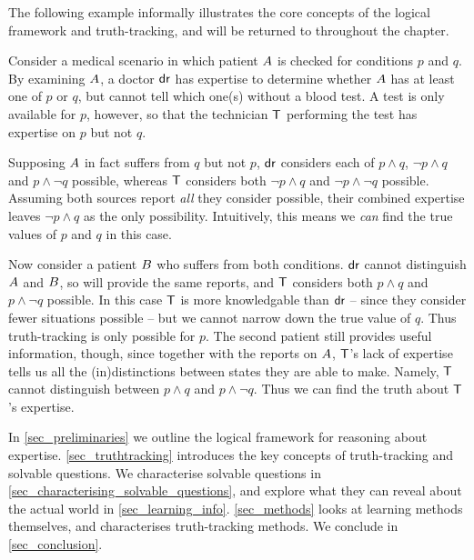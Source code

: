 
The following example informally illustrates the core concepts of the logical
framework and truth-tracking, and will be returned to throughout the chapter.

\begin{example}
    \label{ex_informal_example}

    Consider a medical scenario in which patient $A{}$ is checked for
    conditions $p$ and $q$. By examining $A{}$, a doctor
    $\mathsf{dr}{}$ has expertise to determine whether $A{}$ has at least one
    of $p$ or $q$, but cannot tell which one(s) without a blood test. A test is
    only available for $p$, however, so that the technician $\mathsf{T}{}$
    performing the test has expertise on $p$ but not $q$.

    Supposing $A{}$ in fact suffers from $q$ but not $p$, $\mathsf{dr}{}$
    considers each of $p \land q$, $\neg p \land q$ and $p \land \neg q$
    possible, whereas $\mathsf{T}{}$ considers both $\neg p \land q$ and $\neg p
    \land \neg q$ possible.
    Assuming both sources report \emph{all} they consider possible, their
    combined expertise leaves $\neg p \land q$ as the only
    possibility. Intuitively, this means we \emph{can} find the true values of
    $p$ and $q$ in this case.

    Now consider a patient $B{}$ who suffers from both conditions.
    $\mathsf{dr}{}$ cannot distinguish $A{}$ and $B{}$, so will provide
    the same reports, and $\mathsf{T}{}$ considers both $p \land q$ and $p \land
    \neg q$ possible. In this case $\mathsf{T}{}$ is more knowledgable than $\mathsf{dr}{}$
    -- since they consider fewer situations possible -- but we cannot narrow
    down the true value of $q$. Thus truth-tracking is only possible for $p$.
    The second patient still provides useful information, though, since
    together with the reports on $A{}$,
    $\mathsf{T}{}$'s lack of expertise tells us all the (in)distinctions between
    states they are able to make. Namely, $\mathsf{T}{}$ cannot distinguish between
    $p \land q$ and $p \land \neg q$. Thus we can find the truth about
    $\mathsf{T}{}$'s expertise.

\end{example}

\begin{chapteroutline}
    In \cref{sec_preliminaries} we outline the logical framework for reasoning
    about expertise. \cref{sec_truthtracking} introduces the key concepts of
    truth-tracking and solvable questions. We characterise solvable questions in
    \cref{sec_characterising_solvable_questions}, and explore what they can reveal
    about the actual world in \cref{sec_learning_info}. \cref{sec_methods} looks at
    learning methods themselves, and characterises truth-tracking methods. We
    conclude in \cref{sec_conclusion}.
\end{chapteroutline}

